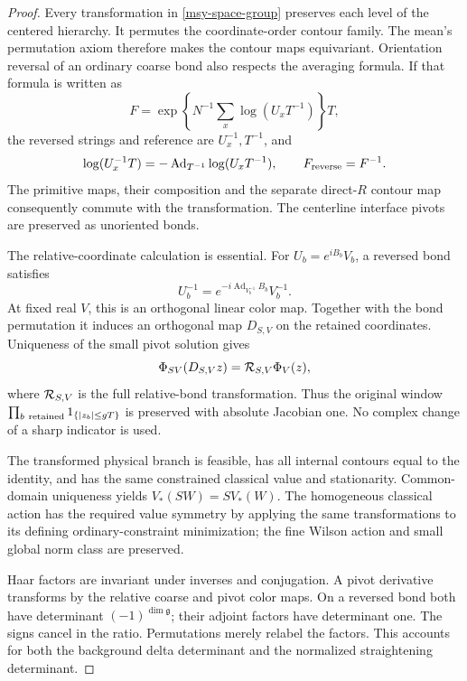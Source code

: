 \documentclass[11pt]{article}
\theoremstyle{remark}
\begin{document}
\begin{proof}
Every transformation in \eqref{msy-space-group} preserves each level
of the centered hierarchy. It permutes the coordinate-order contour
family. The mean's permutation axiom therefore makes the contour
maps equivariant. Orientation reversal of an ordinary coarse bond
also respects the averaging formula. If that formula is written as
\[
 F=\exp\!\left\{N^{-1}\sum_x\log(U_xT^{-1})\right\}T,
\]
the reversed strings and reference are \(U_x^{-1},T^{-1}\), and
\begin{equation}
 \log(U_x^{-1}T)
     =-\operatorname{Ad}_{T^{-1}}\log(U_xT^{-1}),
 \qquad F_{\rm reverse}=F^{-1}.
 \label{msy-average-reversal}
\end{equation}
The primitive maps, their composition and the separate direct-\(R\)
contour map consequently commute with the transformation. The
centerline interface pivots are preserved as unoriented bonds.

The relative-coordinate calculation is essential. For
\(U_b=e^{iB_b}V_b\), a reversed bond satisfies
\begin{equation}
 U_b^{-1}
   =e^{-i\operatorname{Ad}_{V_b^{-1}}B_b}V_b^{-1}.
 \label{msy-relative-reversal}
\end{equation}
At fixed real \(V\), this is an orthogonal linear color map.
Together with the bond permutation it induces an orthogonal map
\(D_{S,V}\) on the retained coordinates. Uniqueness of the small
pivot solution gives
\begin{equation}
 \Phi_{SV}(D_{S,V}z)
       ={\cal R}_{S,V}\Phi_V(z),
 \label{msy-chart}
\end{equation}
where \({\cal R}_{S,V}\) is the full relative-bond transformation.
Thus the original window
\(\prod_{b\ {\rm retained}}1_{\{|z_b|\le gT\}}\)
is preserved with absolute Jacobian one. No complex change of a
sharp indicator is used.

The transformed physical branch is feasible, has all internal
contours equal to the identity, and has the same constrained
classical value and stationarity. Common-domain uniqueness yields
\(V_*(SW)=SV_*(W)\). The homogeneous classical action has the
required value symmetry by applying the same transformations
to its defining ordinary-constraint minimization; the fine Wilson
action and small global norm class are preserved.

Haar factors are invariant under inverses and conjugation. A pivot
derivative transforms by the relative coarse and pivot color maps.
On a reversed bond both have determinant
\((-1)^{\dim\mathfrak g}\); their adjoint factors have determinant
one. The signs cancel in the ratio. Permutations merely relabel
the factors. This accounts for both the background delta
determinant and the normalized straightening determinant.


\end{proof}
\end{document}
